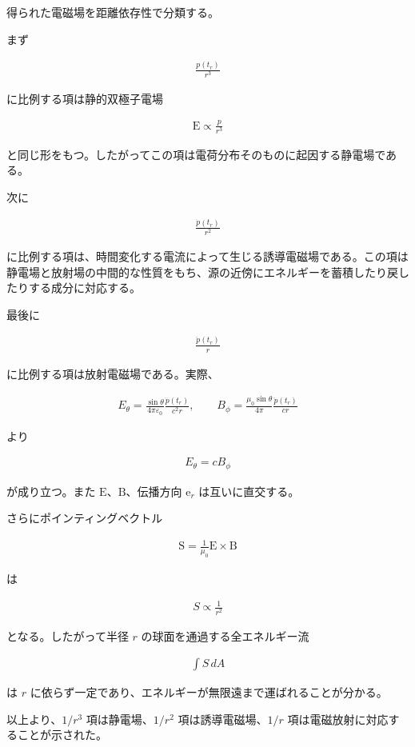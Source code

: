 \documentclass[platex,dvipdfmx,a4paper]{jsarticle}
\newcommand{\vect}[1]{\boldsymbol{\mathrm{#1}}}
\begin{document}
得られた電磁場を距離依存性で分類する。

まず

\begin{align*}
  \frac{p(t_r)}{r^3}
\end{align*}

に比例する項は静的双極子電場

\begin{align*}
  \vect{E}
  \propto
  \frac{p}{r^3}
\end{align*}

と同じ形をもつ。したがってこの項は電荷分布そのものに起因する静電場である。

次に

\begin{align*}
  \frac{\dot p(t_r)}{r^2}
\end{align*}

に比例する項は、時間変化する電流によって生じる誘導電磁場である。この項は静電場と放射場の中間的な性質をもち、源の近傍にエネルギーを蓄積したり戻したりする成分に対応する。

最後に

\begin{align*}
  \frac{\ddot p(t_r)}{r}
\end{align*}

に比例する項は放射電磁場である。実際、

\begin{align*}
  E_\theta
  =
  \frac{\sin\theta}{4\pi\varepsilon_0}
  \frac{\ddot p(t_r)}{c^2r},
  \qquad
  B_\phi
  =
  \frac{\mu_0\sin\theta}{4\pi}
  \frac{\ddot p(t_r)}{cr}
\end{align*}

より

\begin{align*}
  E_\theta
  =
  cB_\phi
\end{align*}

が成り立つ。また \(\vect{E}\)、\(\vect{B}\)、伝播方向 \(\vect{e}_r\) は互いに直交する。

さらにポインティングベクトル

\begin{align*}
  \vect{S}
  =
  \frac{1}{\mu_0}
  \vect{E}\times\vect{B}
\end{align*}

は

\begin{align*}
  S
  \propto
  \frac{1}{r^2}
\end{align*}

となる。したがって半径 \(r\) の球面を通過する全エネルギー流

\begin{align*}
  \int S\,dA
\end{align*}

は \(r\) に依らず一定であり、エネルギーが無限遠まで運ばれることが分かる。

以上より、\(1/r^3\) 項は静電場、\(1/r^2\) 項は誘導電磁場、\(1/r\) 項は電磁放射に対応することが示された。
\end{document}
